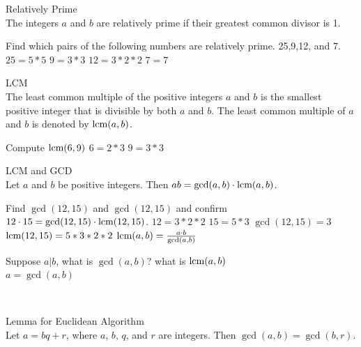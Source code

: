 \begin{defn}{Relatively Prime}$ $\\
The integers $a$ and $b$ are relatively prime if their greatest common divisor is 1.
\end{defn}
\begin{exmp} Find which pairs of the following numbers are relatively prime. 
25,9,12, and 7.
\newline
\noindent
$25=5*5$\newline
$9=3*3$\newline
$12=3*2*2$\newline
$7=7$\newline


\end{exmp}
\begin{defn}{LCM}$ $\\
The least common multiple of the positive integers $a$ and $b$ is the smallest positive integer that is divisible by both $a$ and $b$. The least common multiple of $a$ and $b$ is denoted by $\text{lcm}(a, b)$.
\end{defn}
\begin{exmp}
Compute $\text{lcm}(6,9)$
\newline
$6=2*3$
\newline
$9=3*3$

\end{exmp}
\begin{thm}{LCM and GCD}$ $\\
Let $a$ and $b$ be positive integers. Then $ab = \gcd(a, b) \cdot \text{lcm}(a, b)$.
\end{thm}
\newpage
\begin{exmp}
Find $\gcd(12,15)$ and $\gcd(12,15)$ and  confirm $12\cdot15 = \gcd(12, 15) \cdot \text{lcm}(12, 15)$.
\newline
$12=3*2*2$\newline
$15=5*3$\newline
$\gcd(12,15)=3$\newline
$\text{lcm}(12,15)=5*3*2*2$\newline
\newline
$\text{lcm}(a,b)=\frac{a\cdot b}{\gcd(a,b)}$


\end{exmp}
\begin{exmp}Suppose $a|b$, what is $\gcd(a,b)$? what is $\text{lcm}(a,b)$
$ $\\
$a=\gcd(a,b)$\\

\end{exmp}
\
\begin{thm}{Lemma for Euclidean Algorithm}$ $\\
Let $a = bq + r$, where $a$, $b$, $q$, and $r$ are integers. Then $\gcd(a, b) = \gcd(b, r)$.

\end{thm}
